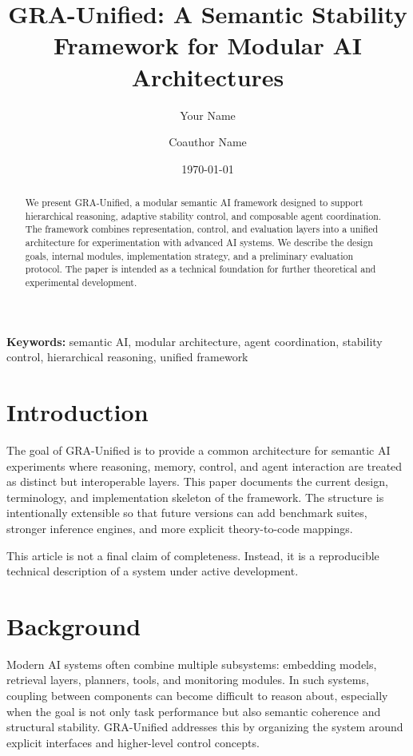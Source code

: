 \documentclass[11pt,a4paper]{article}
\title{GRA-Unified: A Semantic Stability Framework for Modular AI Architectures}
\author{Your Name \and Coauthor Name}
\date{\today}
\begin{document}
\maketitle

\begin{abstract}
We present GRA-Unified, a modular semantic AI framework designed to support hierarchical reasoning, adaptive stability control, and composable agent coordination. The framework combines representation, control, and evaluation layers into a unified architecture for experimentation with advanced AI systems. We describe the design goals, internal modules, implementation strategy, and a preliminary evaluation protocol. The paper is intended as a technical foundation for further theoretical and experimental development.
\end{abstract}

\noindent\textbf{Keywords:} semantic AI, modular architecture, agent coordination, stability control, hierarchical reasoning, unified framework

\tableofcontents
\newpage

\section{Introduction}
The goal of GRA-Unified is to provide a common architecture for semantic AI experiments where reasoning, memory, control, and agent interaction are treated as distinct but interoperable layers. This paper documents the current design, terminology, and implementation skeleton of the framework. The structure is intentionally extensible so that future versions can add benchmark suites, stronger inference engines, and more explicit theory-to-code mappings.

This article is not a final claim of completeness. Instead, it is a reproducible technical description of a system under active development.

\section{Background}
Modern AI systems often combine multiple subsystems: embedding models, retrieval layers, planners, tools, and monitoring modules. In such systems, coupling between components can become difficult to reason about, especially when the goal is not only task performance but also semantic coherence and structural stability. GRA-Unified addresses this by organizing the system around explicit interfaces and higher-level control concepts.
\end{document}
